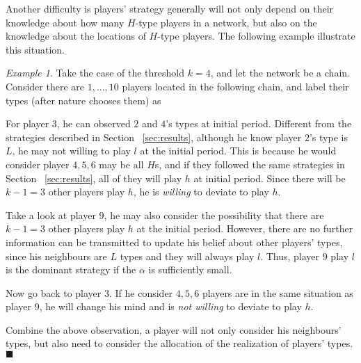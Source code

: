 \documentclass[12pt,letter]{article}
\theoremstyle{remark}
\newtheorem{example}{Example}[section]
\theoremstyle{remark}
\theoremstyle{claim}
\begin{document}
Another difficulty is players' strategy generally will not only depend on their knowledge about how many $H$-type players in a network, but also on the knowledge about the locations of $H$-type players. The following example illustrate this situation.

\bigskip

\begin{example}

Take the case of the threshold $k=4$, and let the network be a chain. Consider there are $1,...,10$ players located in the following chain, and label their types (after nature chooses them) as


\begin{center}
\end{center}

For player $3$, he can observed $2$ and $4$'s types at initial period. Different from the strategies described in Section ~\ref{sec:results}, although he know player $2$'s type is $L$, he may not willing to play $l$ at the initial period. This is because he would consider player $4,5,6$ may be all $H$s, and if they followed the same strategies in Section ~\ref{sec:results}, all of they will play $h$ at initial period. Since there will be $k-1=3$ other players play $h$, he is \textit{willing} to deviate to play $h$.

Take a look at player $9$, he may also consider the possibility that there are $k-1=3$ other players play $h$ at the initial period. However, there are no further information can be transmitted to update his belief about other players' types, since his neighbours are $L$ types and they will always play $l$. Thus, player $9$ play $l$ is the dominant strategy if the $\alpha$ is sufficiently small.

Now go back to player $3$. If he consider $4,5,6$ players are in the same situation as player $9$, he will change his mind and is \textit{not willing} to deviate to play $h$.

Combine the above observation, a player will not only consider his neighbours' types, but also need to consider the allocation of the realization of players' types. $\blacksquare$
\end{example}
\bigskip
\end{document}
